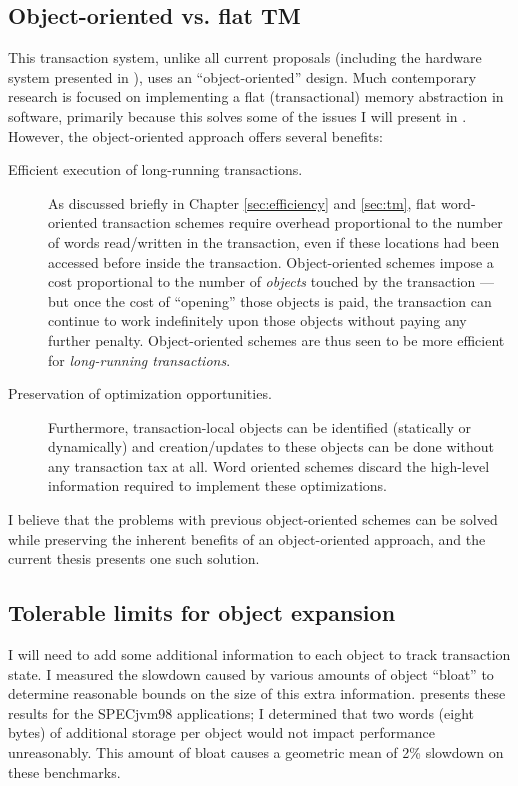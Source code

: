 \subsection{Object-oriented vs. flat TM}
This transaction system, unlike all current proposals
\cite{HarrisFr03,HerlihyMo93} (including the
hardware system presented in ), uses an
``object-oriented'' design.  Much contemporary research is focused on
implementing a flat (transactional) memory abstraction in software,
primarily because this solves some of the issues I will present in
.  However, the object-oriented approach offers
several benefits:
\begin{description}
\item[Efficient execution of long-running transactions.]  As discussed
  briefly in Chapter \ref{sec:efficiency} and \ref{sec:tm}, flat
  word-oriented transaction schemes require overhead proportional to
  the number of words read/written in the transaction, even if these
  locations had been accessed before inside the transaction. Object-oriented
  schemes impose a cost proportional to the number of \emph{objects}
  touched by the transaction --- but once the cost of ``opening'' those
  objects is paid, the transaction can continue to work indefinitely
  upon those objects without paying any further penalty.
  Object-oriented schemes are thus seen to be more efficient for
  \emph{long-running transactions}.
\item[Preservation of optimization opportunities.]  Furthermore,
  transaction-local objects can be identified (statically or
  dynamically) and creation/updates to these objects can be done
  without any transaction tax at all.  Word oriented schemes discard
  the high-level information required to implement these optimizations.
\end{description}
I believe that the problems with previous object-oriented schemes can
be solved while preserving the inherent benefits of an object-oriented
approach, and the current thesis presents one such solution.

\subsection{Tolerable limits for object expansion}
I will need to add some additional information to each object to
track transaction state.  I measured the slowdown caused by various
amounts of object ``bloat'' to determine reasonable bounds on the
size of this extra information.   presents these
results for the SPECjvm98 applications; I determined that two words
(eight bytes) of additional storage per object would not impact
performance unreasonably.  This amount of bloat causes a geometric
mean of 2\% slowdown on these benchmarks.

